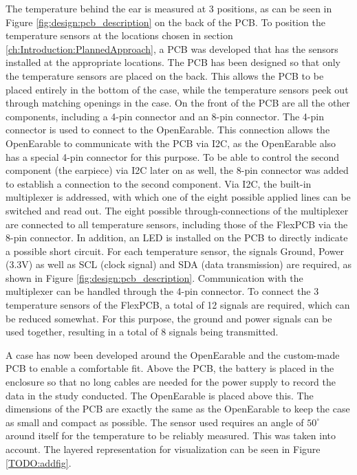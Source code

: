 The temperature behind the ear is measured at 3 positions, as can be seen in Figure \ref{fig:design:pcb_description} on the back of the PCB.
To position the temperature sensors at the locations chosen in section \ref{ch:Introduction:PlannedApproach}, a PCB was developed that has the sensors installed at the appropriate locations. 
The PCB has been designed so that only the temperature sensors are placed on the back. This allows the PCB to be placed entirely in the bottom of the case, while the temperature sensors peek out through matching openings in the case. On the front of the PCB are all the other components, including a 4-pin connector and an 8-pin connector.
The 4-pin connector is used to connect to the OpenEarable. This connection allows the OpenEarable to communicate with the PCB via I2C, as the OpenEarable also has a special 4-pin connector for this purpose.
To be able to control the second component (the earpiece) via I2C later on as well, the 8-pin connector was added to establish a connection to the second component.
Via I2C, the built-in multiplexer is addressed, with which one of the eight possible applied lines can be switched and read out. The eight possible through-connections of the multiplexer are connected to all temperature sensors, including those of the FlexPCB via the 8-pin connector.
In addition, an LED is installed on the PCB to directly indicate a possible short circuit.
For each temperature sensor, the signals Ground, Power (3.3V) as well as SCL (clock signal) and SDA (data transmission) are required, as shown in Figure \ref{fig:design:pcb_description}. Communication with the multiplexer can be handled through the 4-pin connector.
To connect the 3 temperature sensors of the FlexPCB, a total of 12 signals are required, which can be reduced somewhat. For this purpose, the ground and power signals can be used together, resulting in a total of 8 signals being transmitted.

A case has now been developed around the OpenEarable and the custom-made PCB to enable a comfortable fit.
Above the PCB, the battery is placed in the enclosure so that no long cables are needed for the power supply to record the data in the study conducted.
The OpenEarable is placed above this.
The dimensions of the PCB are exactly the same as the OpenEarable to keep the case as small and compact as possible.
The sensor used requires an angle of $ 50 ^ \circ$ around itself for the temperature to be reliably measured. 
This was taken into account.
The layered representation for visualization can be seen in Figure \ref{TODO:addfig}.

